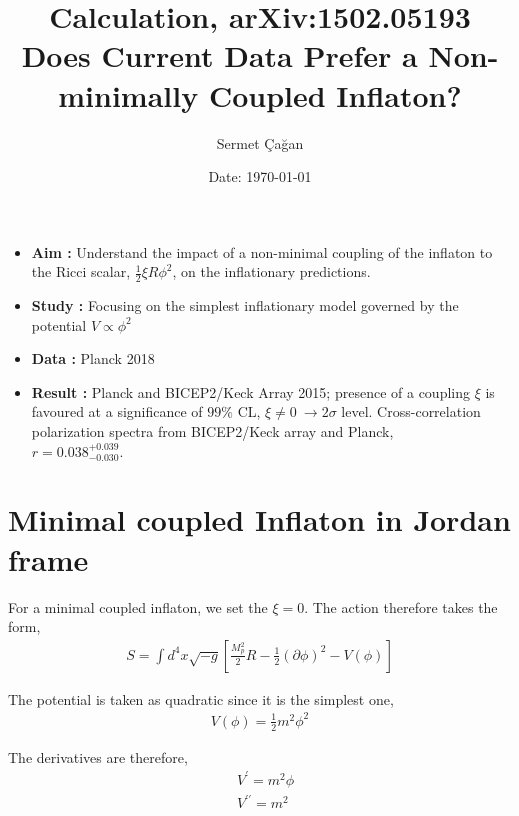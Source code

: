 

\title{\textbf{Calculation, arXiv:1502.05193\\Does Current Data Prefer a Non-minimally Coupled Inflaton?}}
\author{Sermet \c{C}a\u{g}an}
\date{Date: \today}



\maketitle
\vspace{2cm}
\begin{itemize}
\item \textbf{Aim :} Understand the impact of a non-minimal coupling of the inflaton to the Ricci scalar, $\frac{1}{2}\xi R\phi^{2}$, on the inflationary predictions.
\item \textbf{Study :} Focusing on the simplest inflationary model governed by the potential $V \propto \phi^{2}$
\item \textbf{Data :} Planck 2018
\item \textbf{Result :} Planck and BICEP2/Keck Array 2015; presence of a coupling $\xi$ is favoured at a significance of $99\%$ CL, $\xi \ne 0 \ \rightarrow 2\sigma$ level. Cross-correlation polarization spectra from BICEP2/Keck array and Planck,\\ $r = 0.038 ^{+0.039} _{-0.030}$.
\end{itemize}
\newpage

\section{Minimal coupled Inflaton in Jordan frame}

For a minimal coupled inflaton, we set the $\xi = 0$. The action therefore takes the form,
\begin{align}
S = \int d^{4}x \sqrt{-g}\left[\frac{M_{p}^{2}}{2}R - \frac{1}{2}\left(\partial\phi\right)^{2} - V\left(\phi\right)\right]
\end{align}

The potential is taken as quadratic since it is the simplest one,
\begin{align}
V\left(\phi\right) = \frac{1}{2}m^{2}\phi^{2}
\end{align}

The derivatives are therefore,
\begin{align}
&V^{\prime} = m^{2}\phi\\
&V^{\prime\prime} = m^{2}
\end{align}

